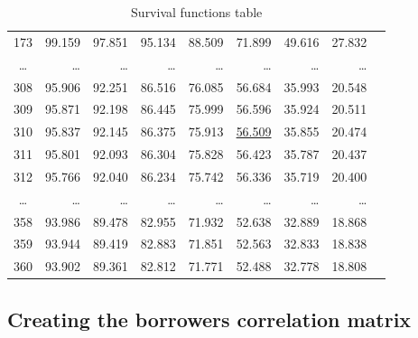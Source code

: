 \documentclass[a4paper,12pt,final]{article}
\begin{document}
\begin{table}[!hb]
\begin{center}
{\begin{tabular}[]{c|rrrrrrrr}
173 &  99.159 &  97.851 &  95.134 &  88.509 &  71.899 &  49.616 &  27.832 \\
\ldots & \ldots & \ldots & \ldots & \ldots & \ldots & \ldots & \ldots \\
308 &  95.906 &  92.251 &  86.516 &  76.085 &  56.684 &  35.993 &  20.548 \\
309 &  95.871 &  92.198 &  86.445 &  75.999 &  56.596 &  35.924 &  20.511 \\
310 &  95.837 &  92.145 &  86.375 &  75.913 &  \underline{56.509} &  35.855 &  20.474 \\
311 &  95.801 &  92.093 &  86.304 &  75.828 &  56.423 &  35.787 &  20.437 \\
312 &  95.766 &  92.040 &  86.234 &  75.742 &  56.336 &  35.719 &  20.400 \\
\ldots & \ldots & \ldots & \ldots & \ldots & \ldots & \ldots & \ldots \\
358 &  93.986 &  89.478 &  82.955 &  71.932 &  52.638 &  32.889 &  18.868 \\
359 &  93.944 &  89.419 &  82.883 &  71.851 &  52.563 &  32.833 &  18.838 \\
360 &  93.902 &  89.361 &  82.812 &  71.771 &  52.488 &  32.778 &  18.808 \\
\end{tabular}
}
\caption{Survival functions table}
\label{example.survivals}
\end{center}
\end{table}

\clearpage 

\subsection{Creating the borrowers correlation matrix}
\end{document}
